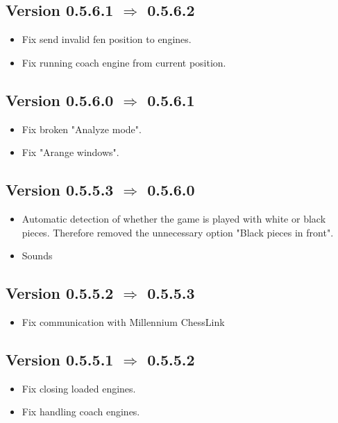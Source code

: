 \documentclass[11pt,a4paper]{article}
\begin{document}
\subsection*{Version 0.5.6.1  $\Rightarrow$  0.5.6.2}
\begin{itemize}
	\item Fix send invalid fen position to engines.
	\item Fix running coach engine from current position.
\end{itemize}

\subsection*{Version 0.5.6.0  $\Rightarrow$  0.5.6.1}
\begin{itemize}
	\item Fix broken "Analyze mode".
	\item Fix "Arange windows". 
\end{itemize}

\subsection*{Version 0.5.5.3  $\Rightarrow$  0.5.6.0}
\begin{itemize}
	\item Automatic detection of whether the game is played with white or black pieces.
	Therefore removed the unnecessary option "Black pieces in front".
	\item Sounds
\end{itemize}

\subsection*{Version 0.5.5.2  $\Rightarrow$  0.5.5.3}
\begin{itemize}
	\item Fix communication with Millennium ChessLink
\end{itemize}

\subsection*{Version 0.5.5.1  $\Rightarrow$  0.5.5.2}
\begin{itemize}
	\item Fix closing loaded engines.
    \item Fix handling coach engines.
\end{itemize}
\end{document}
